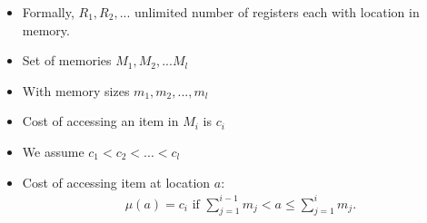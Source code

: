 \documentclass{beamer}
\theoremstyle{plain}
\newcommand{\backupend}{
   \addtocounter{framenumberappendix}{-\value{framenumber}}
   \addtocounter{framenumber}{\value{framenumberappendix}} 
}
\begin{document}
\begin{frame}
\begin{itemize}
\item Formally, $R_1, R_2, ...$ unlimited number of registers each with location in memory.
\item Set of memories $M_1, M_2, ...M_l$
\item With memory sizes $m_1, m_2, ..., m_l$
\item Cost of accessing an item in $M_i$ is $c_i$
\item We assume $c_1 < c_2 < ... < c_l$
\item Cost of accessing item at location $a$:
\begin{align*}
\mu (a) = c_i \text{ if } \sum_{j = 1}^{i-1}m_j  < a \leq \sum_{j = 1}^{i}m_j.
\end{align*}
\end{itemize}
\end{frame}

\backupend
\end{document}
